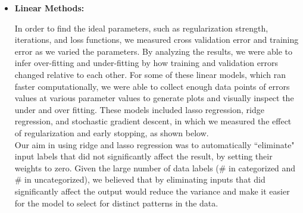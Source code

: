 \begin{itemize}
\begin{itemize}
    \item \textbf{Linear Methods:}


In order to find the ideal parameters, such as regularization strength, iterations, and loss functions, we measured cross validation error and training error as we varied the parameters. By analyzing the results, we were able to infer over-fitting and under-fitting by how training and validation errors changed relative to each other. For some of these linear models, which ran faster computationally, we were able to collect enough data points of errors values at various parameter values to generate plots and visually inspect the under and over fitting. These models included lasso regression, ridge regression, and stochastic gradient descent, in which we measured the effect of regularization and early stopping, as shown below.\\

Our aim in using ridge and lasso regression was to automatically ``eliminate" input labels that did not significantly affect the result, by setting their weights to zero. Given the large number of data labels (\# in categorized and \# in uncategorized), we believed that by eliminating inputs that did significantly affect the output would reduce the variance and make it easier for the model to select for distinct patterns in the data.\\


\end{itemize}
\end{itemize}
